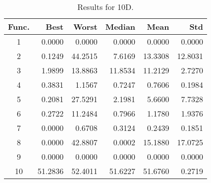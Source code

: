 \begin{table}[ht]
\centering
\caption{ Results for 10D. }
\label{tab:10D}
\begin{tabular}{crrrrr}
\hline
{Func.} & Best & Worst & Median & Mean & Std \\
\hline
1 & 0.0000 & 0.0000 & 0.0000 & 0.0000 & 0.0000 \\
2 & 0.1249 & 44.2515 & 7.6169 & 13.3308 & 12.8031 \\
3 & 1.9899 & 13.8863 & 11.8534 & 11.2129 & 2.7270 \\
4 & 0.3831 & 1.1567 & 0.7247 & 0.7606 & 0.1984 \\
5 & 0.2081 & 27.5291 & 2.1981 & 5.6600 & 7.7328 \\
6 & 0.2722 & 11.2484 & 0.7966 & 1.1780 & 1.9376 \\
7 & 0.0000 & 0.6708 & 0.3124 & 0.2439 & 0.1851 \\
8 & 0.0000 & 42.8807 & 0.0002 & 15.1880 & 17.0725 \\
9 & 0.0000 & 0.0000 & 0.0000 & 0.0000 & 0.0000 \\
10 & 51.2836 & 52.4011 & 51.6227 & 51.6760 & 0.2719 \\
\hline
\end{tabular}
\end{table}
